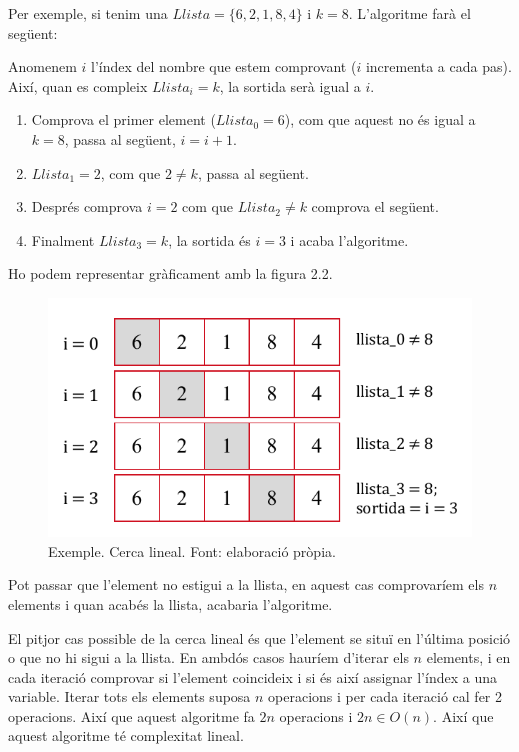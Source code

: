 Per exemple, si tenim una $Llista = \lbrace 6, 2, 1, 8, 4 \rbrace$ i $k = 8$. L'algoritme farà el següent:

Anomenem $i$ l'índex del nombre que estem comprovant ($i$ incrementa a cada pas). Així, quan es compleix $Llista_i = k$, la sortida serà igual a $i$.

\begin{enumerate}
    \item Comprova el primer element ($Llista_0 = 6$), com que aquest no és igual a $k = 8$, passa al següent, $i = i + 1$.
    \item $Llista_1 = 2$, com que $2 \neq k$, passa al següent.
    \item Després comprova $i = 2$ com que $Llista_2 \neq k$ comprova el següent.
    \item Finalment $Llista_3 = k$, la sortida és $i = 3$ i acaba l'algoritme.
\end{enumerate}

\newpage
Ho podem representar gràficament amb la figura 2.2.
\begin{figure}[H]
    \centering
    \includegraphics[width=.55\textwidth]{capitols/figures/linearsearch (2).pdf}
    \caption[Exemple. Cerca lineal.]{Exemple. Cerca lineal. Font: elaboració pròpia.}
    \label{fig:my_label}
\end{figure}

Pot passar que l'element no estigui a la llista, en aquest cas comprovaríem els $n$ elements i quan acabés la llista, acabaria l'algoritme.

El pitjor cas possible de la cerca lineal és que l'element se situï en l'última posició o que no hi sigui a la llista. En ambdós casos hauríem d'iterar els $n$ elements, i en cada iteració comprovar si l'element coincideix i si és així assignar l'índex a una variable. Iterar tots els elements suposa $n$ operacions i per cada iteració cal fer 2 operacions. Així que aquest algoritme fa $2n$ operacions i $2n \in O(n)$. Així que aquest algoritme té complexitat lineal. 


